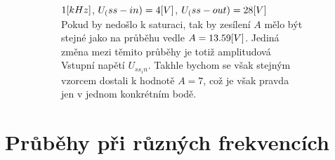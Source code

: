 \documentclass{article}
\begin{document}
\begin{figure}[H]
\begin{figure}[H]
\begin{minipage}[t]{0.49\textwidth}
      \vspace{1mm}
      \(1\-[kHz]\), \(U_(ss-in) = 4\-[V]\), \(U_(ss-out) = 28\-[V]\)\\
      Pokud by nedošlo k saturaci, tak by zesílení \(A\) mělo být stejné jako na průběhu vedle \(A = 13.59\-[V]\).
      Jediná změna mezi těmito průběhy je totiž amplitudová Vstupní napětí \(U_{ss_in}\).
      Takhle bychom se však stejným vzorcem dostali k hodnotě \(A = 7\), což je však pravda jen v jednom konkrétním bodě.
    \end{minipage}
    \vspace{-4mm}
  \end{figure}
\end{figure}

\section*{Průběhy při různých frekvencích}
\end{document}
